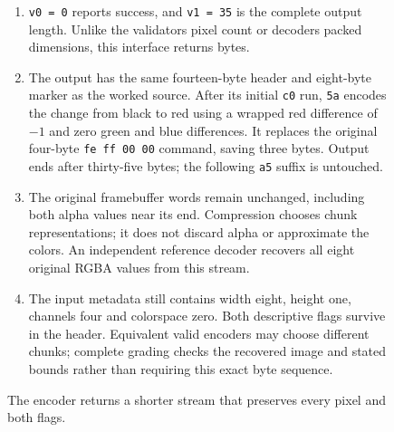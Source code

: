 \begin{figure}[htbp]
\begin{minipage}{\linewidth}
\begin{enumerate}
      \item \texttt{v0 = 0} reports success, and \texttt{v1 = 35} is the complete output length. Unlike the validator\textquotesingle s pixel count or decoder\textquotesingle s packed dimensions, this interface returns bytes.
      \item The output has the same fourteen-byte header and eight-byte marker as the worked source. After its initial \texttt{c0} run, \texttt{5a} encodes the change from black to red using a wrapped red difference of $-1$ and zero green and blue differences. It replaces the original four-byte \texttt{fe ff 00 00} command, saving three bytes. Output ends after thirty-five bytes; the following \texttt{a5} suffix is untouched.
      \item The original framebuffer words remain unchanged, including both alpha values near its end. Compression chooses chunk representations; it does not discard alpha or approximate the colors. An independent reference decoder recovers all eight original RGBA values from this stream.
      \item The input metadata still contains width eight, height one, channels four and colorspace zero. Both descriptive flags survive in the header. Equivalent valid encoders may choose different chunks; complete grading checks the recovered image and stated bounds rather than requiring this exact byte sequence.
    \end{enumerate}
  \end{minipage}
  \caption{The encoder returns a shorter stream that preserves every pixel and both flags.}
  \label{capture:030-qoi-f03}
  \label{qoi-f03}
\end{figure}
\par

